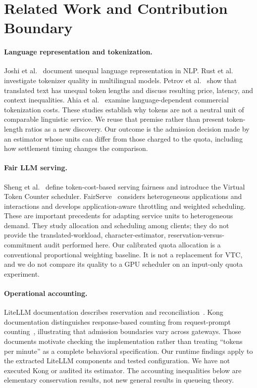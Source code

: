 \documentclass[manuscript,screen]{acmart}
\begin{document}
\section{Related Work and Contribution Boundary}
\paragraph{Language representation and tokenization.}
Joshi et al.~\cite{joshi-etal-2020-state} document unequal language representation in NLP. Rust et al.~\cite{rust-etal-2021-good} investigate tokenizer quality in multilingual models. Petrov et al.~\cite{petrov2023} show that translated text has unequal token lengths and discuss resulting price, latency, and context inequalities. Ahia et al.~\cite{ahia-etal-2023-languages} examine language-dependent commercial tokenization costs. These studies establish why tokens are not a neutral unit of comparable linguistic service. We reuse that premise rather than present token-length ratios as a new discovery. Our outcome is the admission decision made by an estimator whose units can differ from those charged to the quota, including how settlement timing changes the comparison.

\paragraph{Fair LLM serving.}
Sheng et al.~\cite{sheng2024} define token-cost-based serving fairness and introduce the Virtual Token Counter scheduler. FairServe~\cite{khan2024} considers heterogeneous applications and interactions and develops application-aware throttling and weighted scheduling. These are important precedents for adapting service units to heterogeneous demand. They study allocation and scheduling among clients; they do not provide the translated-workload, character-estimator, reservation-versus-commitment audit performed here. Our calibrated quota allocation is a conventional proportional weighting baseline. It is not a replacement for VTC, and we do not compare its quality to a GPU scheduler on an input-only quota experiment.

\paragraph{Operational accounting.}
LiteLLM documentation describes reservation and reconciliation~\cite{litellmdocs}. Kong documentation distinguishes response-based counting from request-prompt counting~\cite{kong}, illustrating that admission boundaries vary across gateways. Those documents motivate checking the implementation rather than treating ``tokens per minute'' as a complete behavioral specification. Our runtime findings apply to the extracted LiteLLM components and tested configuration. We have not executed Kong or audited its estimator. The accounting inequalities below are elementary conservation results, not new general results in queueing theory.
\end{document}
